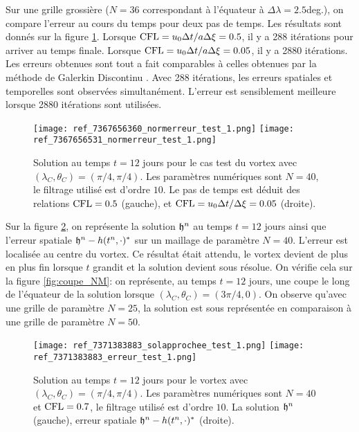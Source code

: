 Sur une grille grossière ($N=36$ correspondant à l'équateur à $\Delta \lambda = 2.5$deg.), on compare l'erreur au cours du temps pour deux pas de temps. Les résultats sont donnés sur la figure \ref{fig:cfl_NM}. Lorsque $\text{CFL} = u_0 \Delta t / a \Delta \xi = 0.5$, il y a 288 itérations pour arriver au temps finale. Lorsque $\text{CFL} = u_0 \Delta t / a \Delta \xi = 0.05$, il y a 2880 itérations. Les erreurs obtenues sont tout a fait comparables à celles obtenues par la méthode de Galerkin Discontinu \cite{Nair2008}. Avec 288 itérations, les erreurs spatiales et temporelles sont observées simultanément. L'erreur est sensiblement meilleure lorsque 2880 itérations sont utilisées.

\begin{figure}[htbp]
\begin{center}
\texttt{[image: ref\_7367656360\_normerreur\_test\_1.png]}
\texttt{[image: ref\_7367656531\_normerreur\_test\_1.png]}
\end{center}
\caption{Solution au temps $t=12$ jours pour le cas test du vortex \cite{Nair2002} avec $(\lambda_C, \theta_C) = (\pi/4, \pi/4)$. Les paramètres numériques sont $N=40$, le filtrage utilisé est d'ordre $10$. Le pas de temps est déduit des relations $\text{CFL} = 0.5$ (gauche), et $\text{CFL} = u_0 \Delta t / \Delta \xi = 0.05$ (droite).}
\label{fig:cfl_NM}
\end{figure}

Sur la figure \ref{fig:space_NM}, on représente la solution $\mathfrak{h}^n$ au temps $t=12$ jours ainsi que l'erreur spatiale $\mathfrak{h}^n-h(t^n,\cdot)^*$ sur un maillage de paramètre $N=40$. L'erreur est localisée au centre du vortex. Ce résultat était attendu, le vortex devient de plus en plus fin lorsque $t$ grandit et la solution devient sous résolue. 
On vérifie cela sur la figure \ref{fig:coupe_NM}: on représente, au temps $t=12$ jours, une coupe le long de l'équateur de la solution lorsque $(\lambda_C, \theta_C)=(3 \pi/4,0)$. On observe qu'avec une grille de paramètre $N=25$, la solution est sous représentée en comparaison à une grille de paramètre $N=50$.

\begin{figure}[htbp]
\begin{center}
\texttt{[image: ref\_7371383883\_solapprochee\_test\_1.png]}
\texttt{[image: ref\_7371383883\_erreur\_test\_1.png]}
\end{center}
\caption{Solution au temps $t=12$ jours pour le vortex \cite{Nair2002} avec $(\lambda_C, \theta_C) = (\pi/4, \pi/4)$. Les paramètres numériques sont $N=40$ et $\text{CFL} = 0.7$, le filtrage utilisé est d'ordre $10$. La solution $\mathfrak{h}^n$ (gauche), erreur spatiale $\mathfrak{h}^n - h(t^n,\cdot)^*$ (droite).}
\label{fig:space_NM}
\end{figure}

